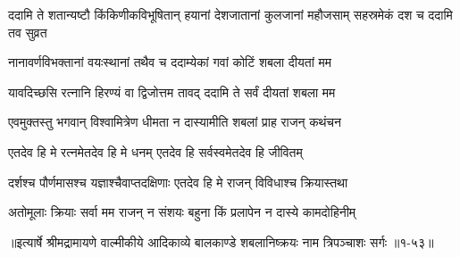 \threelineshloka
{ददामि ते शतान्यष्टौ किंकिणीकविभूषितान्}
{हयानां देशजातानां कुलजानां महौजसाम्}
{सहस्रमेकं दश च ददामि तव सुव्रत} %

\twolineshloka
{नानावर्णविभक्तानां वयःस्थानां तथैव च}
{ददाम्येकां गवां कोटिं शबला दीयतां मम} %

\twolineshloka
{यावदिच्छसि रत्नानि हिरण्यं वा द्विजोत्तम}
{तावद् ददामि ते सर्वं दीयतां शबला मम} %

\twolineshloka
{एवमुक्तस्तु भगवान् विश्वामित्रेण धीमता}
{न दास्यामीति शबलां प्राह राजन् कथंचन} %

\twolineshloka
{एतदेव हि मे रत्नमेतदेव हि मे धनम्}
{एतदेव हि सर्वस्वमेतदेव हि जीवितम्} %

\twolineshloka
{दर्शश्च पौर्णमासश्च यज्ञाश्चैवाप्तदक्षिणाः}
{एतदेव हि मे राजन् विविधाश्च क्रियास्तथा} %

\twolineshloka
{अतोमूलाः क्रियाः सर्वा मम राजन् न संशयः}
{बहुना किं प्रलापेन न दास्ये कामदोहिनीम्} %


॥इत्यार्षे श्रीमद्रामायणे वाल्मीकीये आदिकाव्ये बालकाण्डे शबलानिष्क्रयः नाम त्रिपञ्चाशः सर्गः ॥१-५३॥
